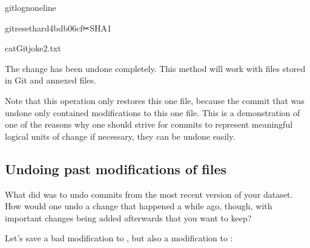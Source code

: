 \begin{sphinxVerbatim}[commandchars=\\\{\}]
gitlog\PYGZhy{}n\PYGZhy{}\PYGZhy{}oneline
\end{sphinxVerbatim}

\begin{sphinxVerbatim}[commandchars=\\\{\}]
gitreset\PYGZhy{}\PYGZhy{}hard4bdb06cf✂SHA1
\end{sphinxVerbatim}

\begin{sphinxVerbatim}[commandchars=\\\{\}]
catGitjoke2.txt
\end{sphinxVerbatim}

\sphinxAtStartPar
The change has been undone completely. This method will work with
files stored in Git and annexed files.

\sphinxAtStartPar
Note that this operation only restores this one file, because the commit that
was undone only contained modifications to this one file. This is a
demonstration of one of the reasons why one should strive for commits to
represent meaningful logical units of change \textendash{} if necessary, they can be
undone easily.


\subsection{Undoing past modifications of files}
\label{\detokenize{basics/101-137-history:undoing-past-modifications-of-files}}
\sphinxAtStartPar
What  did was to undo commits from
the most recent version of your dataset. How
would one undo a change that happened a while ago, though,
with important changes being added afterwards that you want
to keep?

\sphinxAtStartPar
Let’s save a bad modification to ,
but also a modification to :


